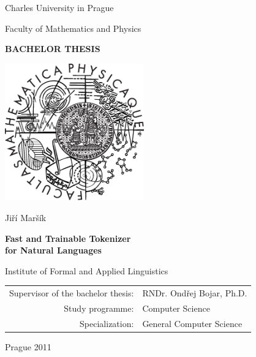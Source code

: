 

\pagestyle{empty}
\begin{center}

\large

Charles University in Prague

\medskip

Faculty of Mathematics and Physics

\vfill

{\bf\Large BACHELOR THESIS}

\vfill

\centerline{\mbox{\includegraphics[width=60mm]{img/logo.eps}}}

\vfill
\vspace{5mm}

{\LARGE Jiří Maršík}

\vspace{15mm}

{\LARGE\bfseries Fast and Trainable Tokenizer \\ for Natural Languages}

\vfill

Institute of Formal and Applied Linguistics

\vfill

\begin{tabular}{rl}

Supervisor of the bachelor thesis: & RNDr. Ondřej Bojar, Ph.D. \\
\noalign{\vspace{2mm}}
Study programme: & Computer Science \\
\noalign{\vspace{2mm}}
Specialization: & General Computer Science \\
\end{tabular}

\vfill

Prague 2011

\end{center}

